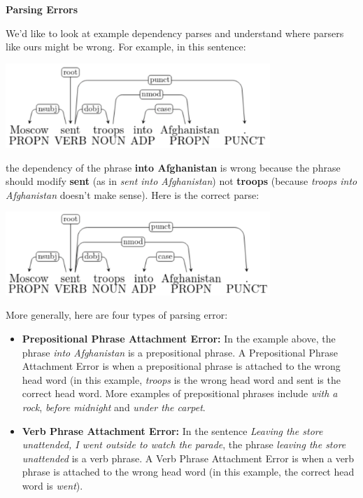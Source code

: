\begin{enumerate}[1.]

{\bf Parsing Errors}

We'd like to look at example dependency parses and understand where parsers like ours might be wrong. For example, in this sentence:

\begin{center}
\includegraphics[width=0.75\textwidth]{6pre-1.png}
\end{center}

the dependency of the phrase {\bf into Afghanistan} is wrong because the phrase should modify {\bf sent} (as in {\em sent into Afghanistan}) not {\bf troops} (because {\em troops into Afghanistan} doesn't make sense). Here is the correct parse:

\begin{center}
\includegraphics[width=0.75\textwidth]{6pre-2.png}
\end{center}

More generally, here are four types of parsing error:

\begin{itemize}
\item {\bf Prepositional Phrase Attachment Error:} In the example above, the phrase {\em into Afghanistan} is a prepositional phrase. A Prepositional Phrase Attachment Error is when a prepositional phrase is attached to the wrong head word (in this example, {\em troops} is the wrong head word and sent is the correct head word. More examples of prepositional phrases include {\em with a rock}, {\em before midnight} and {\em under the carpet}. 

\item {\bf Verb Phrase Attachment Error:} In the sentence {\em Leaving the store unattended, I went outside to watch the parade}, the phrase {\em leaving the store unattended} is a verb phrase. A Verb Phrase Attachment Error is when a verb phrase is attached to the wrong head word (in this example, the correct head word is {\em went}).
   

\end{itemize}
\end{enumerate}
